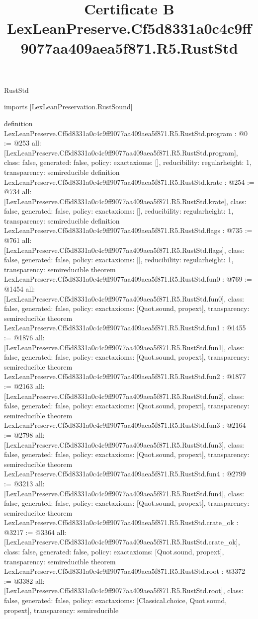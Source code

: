 \begin{lexlean}{RustStd}
\title{Certificate B LexLeanPreserve.Cf5d8331a0c4c9ff9077aa409aea5f871.R5.RustStd}
\begin{coremodule}
imports [LexLeanPreservation.RustSound]

definition LexLeanPreserve.Cf5d8331a0c4c9ff9077aa409aea5f871.R5.RustStd.program : @0 := @253 {
  all: [LexLeanPreserve.Cf5d8331a0c4c9ff9077aa409aea5f871.R5.RustStd.program],
  class: false,
  generated: false,
  policy: exact{axioms: []},
  reducibility: regular{height: 1},
  transparency: semireducible
}
definition LexLeanPreserve.Cf5d8331a0c4c9ff9077aa409aea5f871.R5.RustStd.krate : @254 := @734 {
  all: [LexLeanPreserve.Cf5d8331a0c4c9ff9077aa409aea5f871.R5.RustStd.krate],
  class: false,
  generated: false,
  policy: exact{axioms: []},
  reducibility: regular{height: 1},
  transparency: semireducible
}
definition LexLeanPreserve.Cf5d8331a0c4c9ff9077aa409aea5f871.R5.RustStd.flags : @735 := @761 {
  all: [LexLeanPreserve.Cf5d8331a0c4c9ff9077aa409aea5f871.R5.RustStd.flags],
  class: false,
  generated: false,
  policy: exact{axioms: []},
  reducibility: regular{height: 1},
  transparency: semireducible
}
theorem LexLeanPreserve.Cf5d8331a0c4c9ff9077aa409aea5f871.R5.RustStd.fun0 : @769 := @1454 {
  all: [LexLeanPreserve.Cf5d8331a0c4c9ff9077aa409aea5f871.R5.RustStd.fun0],
  class: false,
  generated: false,
  policy: exact{axioms: [Quot.sound, propext]},
  transparency: semireducible
}
theorem LexLeanPreserve.Cf5d8331a0c4c9ff9077aa409aea5f871.R5.RustStd.fun1 : @1455 := @1876 {
  all: [LexLeanPreserve.Cf5d8331a0c4c9ff9077aa409aea5f871.R5.RustStd.fun1],
  class: false,
  generated: false,
  policy: exact{axioms: [Quot.sound, propext]},
  transparency: semireducible
}
theorem LexLeanPreserve.Cf5d8331a0c4c9ff9077aa409aea5f871.R5.RustStd.fun2 : @1877 := @2163 {
  all: [LexLeanPreserve.Cf5d8331a0c4c9ff9077aa409aea5f871.R5.RustStd.fun2],
  class: false,
  generated: false,
  policy: exact{axioms: [Quot.sound, propext]},
  transparency: semireducible
}
theorem LexLeanPreserve.Cf5d8331a0c4c9ff9077aa409aea5f871.R5.RustStd.fun3 : @2164 := @2798 {
  all: [LexLeanPreserve.Cf5d8331a0c4c9ff9077aa409aea5f871.R5.RustStd.fun3],
  class: false,
  generated: false,
  policy: exact{axioms: [Quot.sound, propext]},
  transparency: semireducible
}
theorem LexLeanPreserve.Cf5d8331a0c4c9ff9077aa409aea5f871.R5.RustStd.fun4 : @2799 := @3213 {
  all: [LexLeanPreserve.Cf5d8331a0c4c9ff9077aa409aea5f871.R5.RustStd.fun4],
  class: false,
  generated: false,
  policy: exact{axioms: [Quot.sound, propext]},
  transparency: semireducible
}
theorem LexLeanPreserve.Cf5d8331a0c4c9ff9077aa409aea5f871.R5.RustStd.crate_ok : @3217 := @3364 {
  all: [LexLeanPreserve.Cf5d8331a0c4c9ff9077aa409aea5f871.R5.RustStd.crate_ok],
  class: false,
  generated: false,
  policy: exact{axioms: [Quot.sound, propext]},
  transparency: semireducible
}
theorem LexLeanPreserve.Cf5d8331a0c4c9ff9077aa409aea5f871.R5.RustStd.root : @3372 := @3382 {
  all: [LexLeanPreserve.Cf5d8331a0c4c9ff9077aa409aea5f871.R5.RustStd.root],
  class: false,
  generated: false,
  policy: exact{axioms: [Classical.choice, Quot.sound, propext]},
  transparency: semireducible
}


\end{coremodule}
\end{lexlean}
